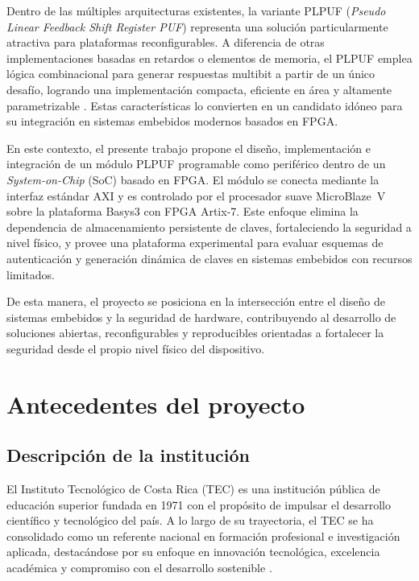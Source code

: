 Dentro de las múltiples arquitecturas existentes, la variante
PLPUF (\textit{Pseudo Linear Feedback Shift Register PUF}) representa una solución
particularmente atractiva para plataformas reconfigurables. A diferencia de otras
implementaciones basadas en retardos o elementos de memoria, el PLPUF emplea lógica
combinacional para generar respuestas multibit a partir de un único desafío, logrando
una implementación compacta, eficiente en área y altamente parametrizable
\cite{hori_2011_pseudolfsr}. Estas características lo convierten en un candidato idóneo
para su integración en sistemas embebidos modernos basados en FPGA.

En este contexto, el presente trabajo propone el diseño, implementación e integración
de un módulo PLPUF programable como periférico dentro de un
\textit{System-on-Chip} (SoC) basado en FPGA. El módulo se conecta mediante la interfaz
estándar AXI y es controlado por el procesador suave MicroBlaze~V sobre la plataforma
Basys3 con FPGA Artix-7. Este enfoque elimina la dependencia de almacenamiento persistente de claves,
fortaleciendo la seguridad a nivel físico, y provee una plataforma experimental
para evaluar esquemas de autenticación y generación dinámica de claves
en sistemas embebidos con recursos limitados.

De esta manera, el proyecto se posiciona en la intersección entre el diseño de sistemas
embebidos y la seguridad de hardware, contribuyendo al desarrollo de soluciones abiertas,
reconfigurables y reproducibles orientadas a fortalecer la seguridad desde el propio
nivel físico del dispositivo.

\section{Antecedentes del proyecto}

\subsection{Descripción de la institución}

El Instituto Tecnológico de Costa Rica (TEC) es una institución pública de educación
superior fundada en 1971 con el propósito de impulsar el desarrollo científico y
tecnológico del país. A lo largo de su trayectoria, el TEC se ha consolidado como un
referente nacional en formación profesional e investigación aplicada, destacándose por
su enfoque en innovación tecnológica, excelencia académica y compromiso con el desarrollo
sostenible \cite{TEC_general}.

